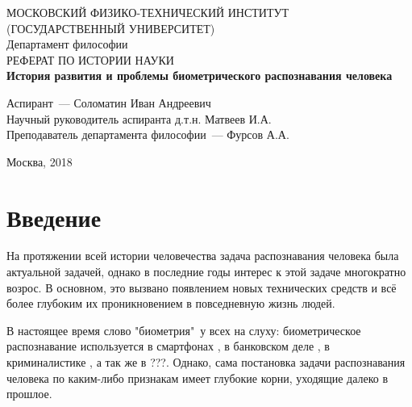 \documentclass[14pt, a4paper]{extarticle}
\begin{document}
	\begin{titlepage}
		\begin{center}
			\hfill \break
			МОСКОВСКИЙ ФИЗИКО-ТЕХНИЧЕСКИЙ ИНСТИТУТ\\ (ГОСУДАРСТВЕННЫЙ УНИВЕРСИТЕТ)\\
			\hfill \break
			\hfill \break
			\hfill \break
			\hfill \break
			\hfill \break
			Департамент философии\\
			\hfill \break
			\hfill \break
			РЕФЕРАТ ПО ИСТОРИИ НАУКИ\\
			\hfill \break
			\hfill \break
			\large{\textbf{История развития и проблемы биометрического распознавания человека}}\\
			\hfill \break		
		\end{center}
		
		\begin{center}
			\hfill \break
			\parbox{0.9\textwidth}
			{
				Аспирант~--- Соломатин Иван Андреевич \\
				Научный руководитель аспиранта \underline{\hspace{3cm}} д.т.н. Матвеев И.А. \\
				Преподаватель департамента философии~--- Фурсов А.А. \\
			}
		\end{center}
		\hfill \break
		\hfill \break
		\hfill \break
		\hfill \break
		\begin{center} Москва, 2018 
		\end{center}
		\thispagestyle{empty} 
	\end{titlepage}
	
\tableofcontents
\newpage

\section{Введение}
На протяжении всей истории человечества задача распознавания человека была актуальной задачей, однако в последние годы интерес к этой задаче многократно возрос. В основном, это вызвано появлением новых технических средств и всё более глубоким их проникновением в повседневную жизнь людей.

В настоящее время слово "биометрия"\ у всех на слуху: биометрическое распознавание используется в смартфонах \cite{odinokikh2018high, sezan2014user, hwang2009keystroke}, в банковском деле \cite{fatima2011banking, venkatraman2008biometrics}, в криминалистике \cite{tistarelli2014biometrics, bouchrika2011using}, а так же в ???. Однако, сама постановка задачи распознавания человека по каким-либо признакам имеет глубокие корни, уходящие далеко в прошлое.
\end{document}

